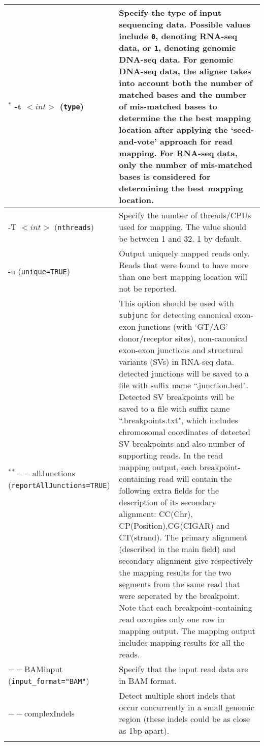\documentclass[12pt]{report}
\newcommand{\code}[1]{{\small\texttt{#1}}}
\begin{document}
\begin{longtable}{|p{4cm}|p{12cm}|}
\hline
$^*$ -t $<int>$ \newline (\code{type}) & Specify the type of input sequencing data. Possible values include \code{0}, denoting RNA-seq data, or \code{1}, denoting genomic DNA-seq data. For genomic DNA-seq data, the aligner takes into account both the number of matched bases and the number of mis-matched bases to determine the the best mapping location after applying the `seed-and-vote' approach for read mapping. For RNA-seq data, only the number of mis-matched bases is considered for determining the best mapping location.\\
\hline
-T $<int>$ \newline (\code{nthreads}) & Specify the number of threads/CPUs used for mapping. The value should be between 1 and 32. 1 by default.\\
\hline
-u \newline (\code{unique=TRUE}) & Output uniquely mapped reads only. Reads that were found to have more than one best mapping location will not be reported.\\
\hline
$^{**}$$--$allJunctions \newline (\code{reportAllJunctions=TRUE}) & This option should be used with \code{subjunc} for detecting canonical exon-exon junctions (with `GT/AG' donor/receptor sites), non-canonical exon-exon junctions and structural variants (SVs) in RNA-seq data. detected junctions will be saved to a file with suffix name ``.junction.bed". Detected SV breakpoints will be saved to a file with suffix name ``.breakpoints.txt", which includes chromosomal coordinates of detected SV breakpoints and also number of supporting reads. In the read mapping output, each breakpoint-containing read will contain the following extra fields for the description of its secondary alignment: CC(Chr), CP(Position),CG(CIGAR) and CT(strand). The primary alignment (described in the main field) and secondary alignment give respectively the mapping results for the two segments from the same read that were seperated by the breakpoint. Note that each breakpoint-containing read occupies only one row in mapping output. The mapping output includes mapping results for all the reads.\\
\hline
$--$BAMinput \newline (\code{input\_format="BAM"}) & Specify that the input read data are in BAM format.\\
\hline
$--$complexIndels & Detect multiple short indels that occur concurrently in a small genomic region (these indels could be as close as 1bp apart).\\
$$
\end{longtable}
\end{document}
